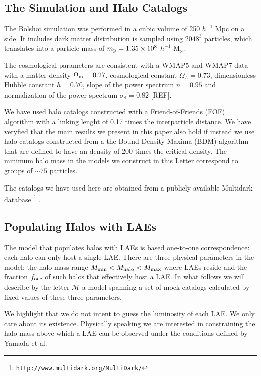 \documentclass{emulateapj}
\begin{document}
\subsection{The Simulation and Halo Catalogs}

The Bolshoi simulation was performed in a cubic volume of 250 $h^{-1}$ Mpc on a side. It includes dark matter distribution is sampled using $2048^{3}$ particles, which translates into a particle mass of $m_{\rm p}=1.35\times 10^{8}$ $h^{-1}$ M$_{\odot}$. 


The cosmological parameters are consistent with a WMAP5 and WMAP7 data with a matter density $\Omega_{\rm m} = 0.27$, cosmological constant $\Omega_{\Lambda}=0.73$, dimensionless Hubble constant $h=0.70$, slope of the power spectrum $n=0.95$ and normalization of the power spectrum $\sigma_{8}=0.82$ [REF].

We have used halo catalogs constructed with a Friend-of-Friends (FOF) algorithm with a linking lenght of 0.17 times the interparticle distance. We have veryfied that the main results we present in this paper also hold if instead we use halo catalogs constructed from a the Bound Density Maxima (BDM) algorithm \citep{KlypinBDM} that are defined to have an density of 200 times the critical density. The minimum halo mass in the models we construct in this Letter correspond to groups of $\sim 75$ particles.

The catalogs we have used here are obtained from a publicly available Multidark database \footnote{{\tt http://www.multidark.org/MultiDark/}} \citep{2011arXiv1109.0003R}. 


\subsection{Populating Halos with LAEs}
\label{subsec:mocks}


The model that populates halos with LAEs is based one-to-one correspondence: each halo can only host a single LAE. There are three physical parameters in the model: the halo mass range $M_{\rm min}< M_{\rm halo} < M_{\rm max}$ where LAEs reside and the fraction $f_{\rm occ}$ of such halos that effectively host a LAE. In what follows we will describe by the letter ${\mathcal M}$ a model spanning a set of mock catalogs calculated by fixed values of these three parameters.

We highlight that we do not intent to guess the luminosity of each LAE. We only care about its existence. Physically speaking we are interested in constraining the halo mass above which a LAE can be observed under the conditions defined by Yamada et al. 
\end{document}
